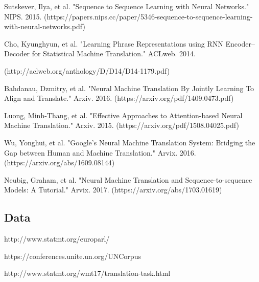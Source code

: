 \documentclass[10pt,a4paper]{article}
\begin{document}
Sutskever, Ilya, et al. "Sequence to Sequence Learning with Neural Networks." NIPS. 2015.
(https://papers.nips.cc/paper/5346-sequence-to-sequence-learning-with-neural-networks.pdf)
\newline

Cho, Kyunghyun, et al. "Learning Phrase Representations using RNN Encoder–Decoder for Statistical Machine Translation." ACLweb. 2014.
\newline

(http://aclweb.org/anthology/D/D14/D14-1179.pdf)
\newline

Bahdanau, Dzmitry, et al. "Neural Machine Translation By Jointly Learning To Align and Translate." Arxiv. 2016.
(https://arxiv.org/pdf/1409.0473.pdf)
\newline

Luong, Minh-Thang, et al. "Effective Approaches to Attention-based Neural Machine Translation." Arxiv. 2015.
(https://arxiv.org/pdf/1508.04025.pdf)
\newline

Wu, Yonghui, et al. "Google’s Neural Machine Translation System: Bridging the Gap between Human and Machine Translation." Arvix. 2016.
(https://arxiv.org/abs/1609.08144)
\newline

Neubig, Graham, et al. "Neural Machine Translation and Sequence-to-sequence Models: A Tutorial." Arvix. 2017.
(https://arxiv.org/abs/1703.01619)
\newline

\subsection{Data}

http://www.statmt.org/europarl/

https://conferences.unite.un.org/UNCorpus

http://www.statmt.org/wmt17/translation-task.html
\end{document}
